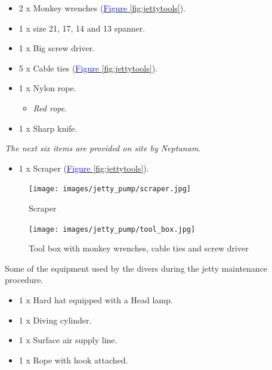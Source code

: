 \documentclass[
  12pt,
]{report}
\providecommand{\tightlist}{%
  \setlength{\itemsep}{0pt}\setlength{\parskip}{0pt}}\usepackage{longtable,booktabs,array}
\begin{document}
\begin{itemize}
\tightlist
\item
  2 x Monkey wrenches
  (\ul{\textcolor{blue}{Figure \ref{fig:jettytools}}}).
\item
  1 x size 21, 17, 14 and 13 spanner.
\item
  1 x Big screw driver.
\item
  5 x Cable ties (\ul{\textcolor{blue}{Figure \ref{fig:jettytools}}}).
\item
  1 x Nylon rope.

  \begin{itemize}
  \tightlist
  \item
    \emph{Red rope}.
  \end{itemize}
\item
  1 x Sharp knife.
\end{itemize}

\emph{The next six items are provided on site by Neptunam}.

\begin{itemize}
\tightlist
\item
  1 x Scraper (\ul{\textcolor{blue}{Figure \ref{fig:jettytools}}}).
\end{itemize}

\begin{figure}[H]

{\centering \texttt{[image: images/jetty\_pump/scraper.jpg]}

}

\caption{Scraper}

\end{figure}

\begin{figure}[H]

{\centering \texttt{[image: images/jetty\_pump/tool\_box.jpg]}

}

\caption{Tool box with monkey wrenches, cable ties and screw driver}

\end{figure}

Some of the equipment used by the divers during the jetty maintenance
procedure.

\begin{itemize}
\tightlist
\item
  1 x Hard hat equipped with a Head lamp.
\item
  1 x Diving cylinder.
\item
  1 x Surface air supply line.
\item
  1 x Rope with hook attached.
\end{itemize}
\end{document}
